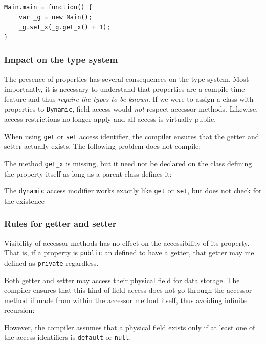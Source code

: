 \documentclass{article}
\newcommand{\type}[1]{\texttt{#1}}
\newcommand{\expr}[1]{\texttt{#1}}
\begin{document}
\begin{lstlisting}
Main.main = function() {
	var _g = new Main();
	_g.set_x(_g.get_x() + 1);
}
\end{lstlisting}



\subsubsection{Impact on the type system}

The presence of properties has several consequences on the type system. Most importantly, it is necessary to understand that properties are a compile-time feature and thus \emph{require the types to be known}. If we were to assign a class with properties to \type{Dynamic}, field access would \emph{not} respect accessor methods. Likewise, access restrictions no longer apply and all access is virtually public.

When using \expr{get} or \expr{set} access identifier, the compiler ensures that the getter and setter actually exists. The following problem does not compile:



The method \expr{get_x} is missing, but it need not be declared on the class defining the property itself as long as a parent class defines it:



The \expr{dynamic} access modifier works exactly like \expr{get} or \expr{set}, but does not check for the existence



\subsubsection{Rules for getter and setter}

Visibility of accessor methods has no effect on the accessibility of its property. That is, if a property is \expr{public} an defined to have a getter, that getter may me defined as \expr{private} regardless.

Both getter and setter may access their physical field for data storage. The compiler ensures that this kind of field access does not go through the accessor method if made from within the accessor method itself, thus avoiding infinite recursion:



However, the compiler assumes that a physical field exists only if at least one of the access identifiers is \expr{default} or \expr{null}.
\end{document}
